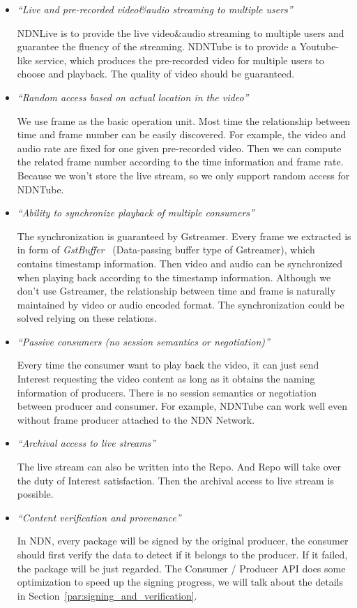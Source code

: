 \begin{itemize}
\item{\textit{``Live and pre-recorded video\&audio streaming to multiple users''}}

NDNLive is to provide the live video\&audio streaming to multiple users and guarantee the fluency of the streaming. NDNTube is to provide a Youtube-like service, which produces the pre-recorded video for multiple users to choose and playback. The quality of video should be guaranteed.

\item{\textit{``Random access based on actual location in the video''}}

We use frame as the basic operation unit. Most time the relationship between time and frame number can be easily discovered. For example, the video and audio rate are fixed for one given pre-recorded video. Then we can compute the related frame number according to the time information and frame rate. Because we won't store the live stream, so we only support random access for NDNTube.

\item{\textit{``Ability to synchronize playback of multiple consumers''}}

The synchronization is guaranteed by Gstreamer. Every frame we extracted is in form of \textit{GstBuffer}~\cite{Gstbuffer} (Data-passing buffer type of Gstreamer), which contains timestamp information. Then video and audio can be synchronized when playing back according to the timestamp information. Although we don't use Gstreamer, the relationship between time and frame is naturally maintained by video or audio encoded format. The synchronization could be solved relying on these relations.

\item{\textit{``Passive consumers (no session semantics or negotiation)''}}

Every time the consumer want to play back the video, it can just send Interest requesting the video content as long as it obtains the naming information of producers. There is no session semantics or negotiation between producer and consumer. For example, NDNTube can work well even without frame producer attached to the NDN Network.

\item{\textit{``Archival access to live streams''}}

The live stream can also be written into the Repo. And Repo will take over the duty of Interest satisfaction. Then the archival access to live stream is possible.

\item{\textit{``Content verification and provenance''}}

In NDN, every package will be signed by the original producer, the consumer should first verify the data to detect if it belongs to the producer. If it failed, the package will be just regarded. The Consumer / Producer API does some optimization to speed up the signing progress, we will talk about the details in Section~\ref{par:signing_and_verification}.

\end{itemize} 

